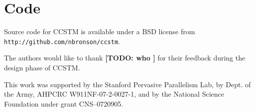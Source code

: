 \documentclass[preprint]{sigplanconf}
\newcommand{\todo}[1]{{\color{red} \bf [TODO: #1 ]}}
\begin{document}

\appendix
\section{Code}

Source code for CCSTM is available under a BSD license from
\texttt{http://github.com/nbronson/ccstm}.


\acks

The authors would like to thank \todo{who} for their feedback
during the design phase of CCSTM.

This work was supported by the Stanford Pervasive Parallelism Lab,
by Dept. of the Army, AHPCRC W911NF-07-2-0027-1, and by
the National Science Foundation under grant CNS--0720905.

{\small




}
\end{document}
